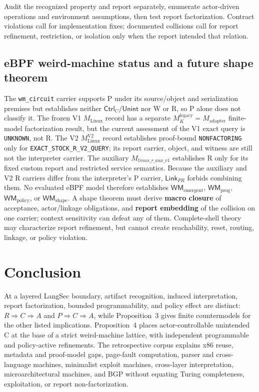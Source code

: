 \documentclass[conference]{IEEEtran}
\begin{document}
Audit the recognized property and report separately, enumerate actor-driven operations and environment assumptions, then test report factorization. Contract violations call for implementation fixes; documented collisions call for report refinement, restriction, or isolation only when the report intended that relation.

\subsection{eBPF weird-machine status and a future shape theorem}

The \texttt{wm\_circuit} carrier supports P under its source/object and serialization premises but establishes neither $\mathsf{Ctrl}_C/\mathsf{Unint}$ nor W or R, so P alone does not classify it. The frozen V1 $M_{\mathrm{Linux}}$ record has a separate $M_K^{\mathrm{legacy}}=M_{\mathrm{adapter}}$ finite-model factorization result, but the current assessment of the V1 exact query is \texttt{UNKNOWN}, not R. The V2 $M_{\mathrm{Linux}}^{\mathrm{V2}}$ record establishes proof-bound \texttt{NONFACTORING} only for \texttt{EXACT\_STOCK\_R\_V2\_QUERY}; its report carrier, object, and witness are still not the interpreter carrier. The auxiliary $M_{\mathit{linux\_r\_aux\_v1}}$ establishes R only for its fixed custom report and restricted service semantics. Because the auxiliary and V2 R carriers differ from the interpreter's P carrier, $\mathsf{Link}_{PR}$ forbids combining them. No evaluated eBPF model therefore establishes $\mathsf{WM}_{\mathrm{emergent}}$, $\mathsf{WM}_{\mathrm{prog}}$, $\mathsf{WM}_{\mathrm{policy}}$, or $\mathsf{WM}_{\mathrm{shape}}$. A shape theorem must derive \textbf{macro closure} of acceptance, actor/linkage obligations, and \textbf{report embedding} of the collision on one carrier; context sensitivity can defeat any of them. Complete-shell theory \cite{ref17} may characterize report refinement, but cannot create reachability, reset, routing, linkage, or policy violation.

\section{Conclusion}

At a layered LangSec boundary, artifact recognition, induced interpretation, report factorization, bounded programmability, and policy effect are distinct: $R\Rightarrow C\Rightarrow A$ and $P\Rightarrow C\Rightarrow A$, while Proposition~3 gives finite countermodels for the other listed implications. Proposition~4 places actor-controllable unintended C at the base of a strict weird-machine lattice, with independent programmable and policy-active refinements. The retrospective corpus explains x86 reuse, metadata and proof-model gaps, page-fault computation, parser and cross-language machines, minimalist exploit machines, cross-layer interpretation, microarchitectural machines, and BGP without equating Turing completeness, exploitation, or report non-factorization.
\end{document}
